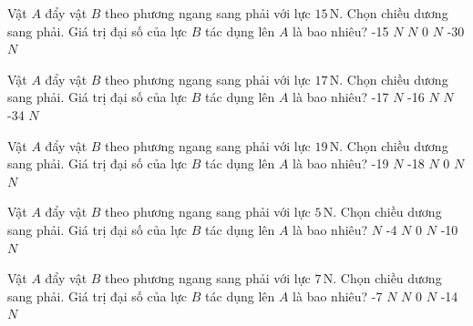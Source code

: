 \begin{ex}
Vật $A$ đẩy vật $B$ theo phương ngang sang phải với lực $15\,\text{N}$. Chọn chiều dương sang phải. Giá trị đại số của lực $B$ tác dụng lên $A$ là bao nhiêu?
\choice
{-15 $N$}
{ $N$}
{0 $N$}
{-30 $N$}
\end{ex}

\begin{ex}
Vật $A$ đẩy vật $B$ theo phương ngang sang phải với lực $17\,\text{N}$. Chọn chiều dương sang phải. Giá trị đại số của lực $B$ tác dụng lên $A$ là bao nhiêu?
\choice
{-17 $N$}
{-16 $N$}
{ $N$}
{-34 $N$}
\end{ex}

\begin{ex}
Vật $A$ đẩy vật $B$ theo phương ngang sang phải với lực $19\,\text{N}$. Chọn chiều dương sang phải. Giá trị đại số của lực $B$ tác dụng lên $A$ là bao nhiêu?
\choice
{-19 $N$}
{-18 $N$}
{0 $N$}
{ $N$}
\end{ex}

\begin{ex}
Vật $A$ đẩy vật $B$ theo phương ngang sang phải với lực $5\,\text{N}$. Chọn chiều dương sang phải. Giá trị đại số của lực $B$ tác dụng lên $A$ là bao nhiêu?
\choice
{ $N$}
{-4 $N$}
{0 $N$}
{-10 $N$}
\end{ex}

\begin{ex}
Vật $A$ đẩy vật $B$ theo phương ngang sang phải với lực $7\,\text{N}$. Chọn chiều dương sang phải. Giá trị đại số của lực $B$ tác dụng lên $A$ là bao nhiêu?
\choice
{-7 $N$}
{ $N$}
{0 $N$}
{-14 $N$}
\end{ex}

